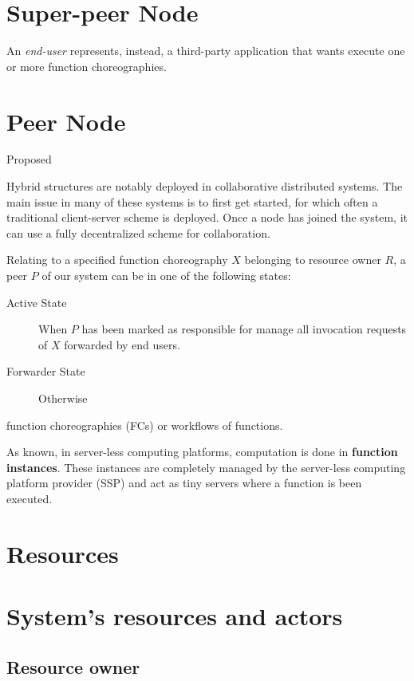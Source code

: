 \documentclass[10pt,a4paper]{article}
\theoremstyle{definition}
\begin{document}
\tableofcontents
\newpage

\section{Super-peer Node}


An \textit{end-user} represents, instead, a third-party application that wants execute  one or more function choreographies.

\section{Peer Node}

Proposed 

Hybrid structures are notably deployed in collaborative distributed systems.
The main issue in many of these systems is to first get started, for which often
a traditional client-server scheme is deployed. Once a node has joined the
system, it can use a fully decentralized scheme for collaboration.


Relating to a specified function choreography $X$ belonging to resource owner $R$, a peer $P$ of our system can be in one of the following states:

\begin{description}
\item[Active State] When $P$ has been marked as responsible for manage all invocation requests of $X$ forwarded by end users.
\item[Forwarder State] Otherwise
\end{description}


function choreographies (FCs) or workflows of
functions. 

As known, in server-less computing platforms, computation is done in \textbf{function instances}. These instances are completely managed by the server-less computing platform provider (SSP) and act as tiny servers where a function is been executed.


\section{Resources}





\section{System's resources and actors}

\subsection{Resource owner}
\end{document}
